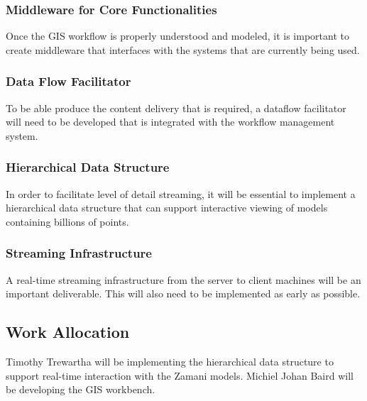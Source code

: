 \documentclass[12pt,a4paper]{article}
\begin{document}
\subsubsection*{Middleware for Core Functionalities}
Once the GIS workflow is properly understood and modeled, it is
important to create middleware that interfaces with the systems that are
currently being used.
\subsubsection*{Data Flow Facilitator}
To be able produce the content delivery that is required, a dataflow
facilitator will need to be developed that is integrated with the
workflow management system.
\subsubsection*{Hierarchical Data Structure}
In order to facilitate level of detail streaming, it will be essential to
implement a hierarchical data structure that can support interactive
viewing of models containing billions of points.
\subsubsection*{Streaming Infrastructure}
A real-time streaming infrastructure from the server to client machines will be
an important deliverable. This will also need to be implemented as early as
possible.
\subsection{Work Allocation}
Timothy Trewartha will be implementing the hierarchical data structure to support
real-time interaction with the Zamani models. Michiel Johan Baird will be developing
the GIS workbench.






\end{document}

